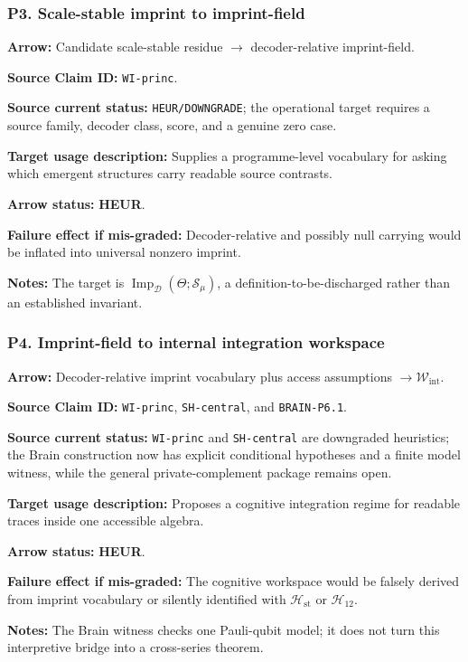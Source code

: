 \documentclass[12pt,a4paper]{article}
\begin{document}
\subsubsection*{P3. Scale-stable imprint to imprint-field}
\noindent\textbf{Arrow:} Candidate scale-stable residue \(\to\)
decoder-relative imprint-field.\par
\noindent\textbf{Source Claim ID:} \texttt{WI-princ}.\par
\noindent\textbf{Source current status:} \texttt{HEUR/DOWNGRADE}; the
operational target requires a source family, decoder class, score, and a
genuine zero case.\par
\noindent\textbf{Target usage description:} Supplies a programme-level
vocabulary for asking which emergent structures carry readable source
contrasts.\par
\noindent\textbf{Arrow status:} \textbf{HEUR}.\par
\noindent\textbf{Failure effect if mis-graded:} Decoder-relative and
possibly null carrying would be inflated into universal nonzero imprint.\par
\noindent\textbf{Notes:} The target is
\(\operatorname{Imp}_{\mathcal D}(\Theta;\mathcal S_\mu)\), a
definition-to-be-discharged rather than an established invariant.\par

\subsubsection*{P4. Imprint-field to internal integration workspace}
\noindent\textbf{Arrow:} Decoder-relative imprint vocabulary plus access
assumptions \(\to\mathcal W_{\mathrm{int}}\).\par
\noindent\textbf{Source Claim ID:} \texttt{WI-princ},
\texttt{SH-central}, and \texttt{BRAIN-P6.1}.\par
\noindent\textbf{Source current status:} \texttt{WI-princ} and
\texttt{SH-central} are downgraded heuristics; the Brain construction now
has explicit conditional hypotheses and a finite model witness, while
the general private-complement package remains open.\par
\noindent\textbf{Target usage description:} Proposes a cognitive
integration regime for readable traces inside one accessible algebra.\par
\noindent\textbf{Arrow status:} \textbf{HEUR}.\par
\noindent\textbf{Failure effect if mis-graded:} The cognitive workspace
would be falsely derived from imprint vocabulary or silently identified
with \(\mathcal H_{\mathrm{st}}\) or \(\mathcal H_{12}\).\par
\noindent\textbf{Notes:} The Brain witness checks one
Pauli-qubit model; it does not turn this interpretive bridge into a
cross-series theorem.\par
\end{document}
